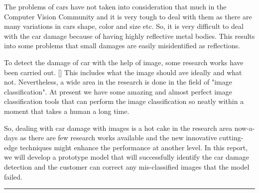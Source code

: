 \documentclass[lang=english,inputenc=utf8,fontsize=10pt]{ldvarticle}
\begin{document}
The problems of cars have not taken into consideration that much in the Computer Vision Community and it is very tough to deal with them as there are many variations in cars shape, color and size etc. So, it is very difficult to deal with the car damage because of having highly reflective metal bodies. This results into some problems that small damages are easily misidentified as reflections.

To detect the damage of car with the help of image, some research works have been carried out. [] This includes what the image should ave ideally and what not. Nevertheless, a wide area in the research is done in the field of "image classification". At present we have some amazing and almost perfect image classification tools that can perform the image classification so neatly within a moment that takes a human a long time. 

So, dealing with car damage with images is a hot cake in the research area now-a-days as there are few research works available and the new innovative cutting-edge techniques might enhance the performance at another level. In this report, we will develop a prototype model that will successfully identify the car damage detection and the customer can correct any mis-classified images that the model failed.

\vspace*{1cm}
\hrule

\newpage
\end{document}
